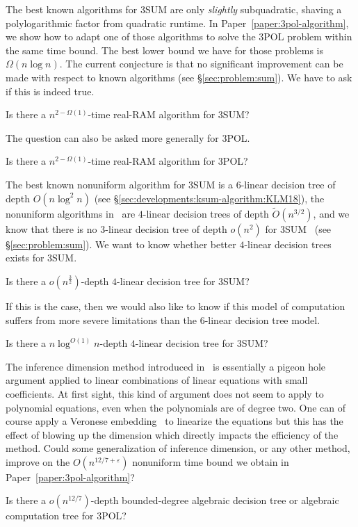 The best known algorithms for 3SUM are only \emph{slightly} subquadratic,
shaving a polylogarithmic factor from quadratic runtime.
In Paper~\ref{paper:3pol-algorithm}, we show how to adapt one of those
algorithms to solve the 3POL problem within the same time bound.
%
The best lower bound we have for those problems is \(\Omega(n \log n)\). The
current conjecture is that no significant improvement can be made with respect
to known algorithms (see
\S\ref{sec:problem:sum}).
%
We have to ask if this is indeed true.
\begin{openquestion}
	Is there a \(n^{2-\Omega(1)}\)-time real-RAM algorithm for 3SUM?
\end{openquestion}

The question can also be asked more generally for 3POL.
\begin{openquestion}
	Is there a \(n^{2-\Omega(1)}\)-time real-RAM algorithm for 3POL?
\end{openquestion}

The best known nonuniform algorithm for 3SUM is a \(6\)-linear decision tree of
depth \(O(n \log^2 n)\) (see \S\ref{sec:developments:ksum-algorithm:KLM18}),
the nonuniform algorithms in~\cite{GP18,Fr15,GS15} are
\(4\)-linear decision trees of depth \( \tilde{O}(n^{3/2}) \), and we know that
there is no \(3\)-linear decision tree of depth \(o(n^2)\) for
3SUM~\cite{Er99a} (see \S\ref{sec:problem:sum}).
We want to know whether better \(4\)-linear decision trees exists for 3SUM.
\begin{openquestion}
	Is there a \(o(n^{\frac 32})\)-depth \(4\)-linear decision tree for 3SUM?
\end{openquestion}

If this is the case, then we would also like to know if this model of
computation suffers from more severe limitations than the \(6\)-linear decision tree
model.
\begin{openquestion}
	Is there a \(n \log^{O(1)} n\)-depth \(4\)-linear decision tree for 3SUM?
\end{openquestion}

The inference dimension method introduced in~\cite{KLM18} is essentially a
pigeon hole argument applied to linear combinations of linear equations with small coefficients.
At first sight, this kind of argument does not seem to apply to polynomial
equations, even when the polynomials are of degree two. One can of course apply
a Veronese embedding~\cite{Har77,Har13} to linearize the equations but this has
the effect of blowing up the dimension which directly impacts the efficiency of
the method. Could some generalization of inference dimension, or any other
method,
improve on the \(O(n^{12/7 + \varepsilon})\) nonuniform time bound we obtain in
Paper~\ref{paper:3pol-algorithm}?
\begin{openquestion}
	Is there a \(o(n^{12/7})\)-depth bounded-degree algebraic decision tree or
	algebraic computation tree for 3POL?
\end{openquestion}

